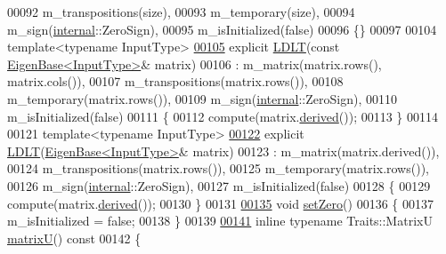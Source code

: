 \begin{DoxyCode}
00092         m\_transpositions(size),
00093         m\_temporary(size),
00094         m\_sign(\hyperlink{namespaceinternal}{internal}::ZeroSign),
00095         m\_isInitialized(false)
00096     \{\}
00097 
00104     \textcolor{keyword}{template}<\textcolor{keyword}{typename} InputType>
\hyperlink{group___cholesky___module_ad0e8d2131ea1a626a08d98e9effb1cc5}{00105}     \textcolor{keyword}{explicit} \hyperlink{group___cholesky___module_ad0e8d2131ea1a626a08d98e9effb1cc5}{LDLT}(\textcolor{keyword}{const} \hyperlink{group___core___module_struct_eigen_1_1_eigen_base}{EigenBase<InputType>}& matrix)
00106       : m\_matrix(matrix.rows(), matrix.cols()),
00107         m\_transpositions(matrix.rows()),
00108         m\_temporary(matrix.rows()),
00109         m\_sign(\hyperlink{namespaceinternal}{internal}::ZeroSign),
00110         m\_isInitialized(false)
00111     \{
00112       compute(matrix.\hyperlink{group___core___module_a324b16961a11d2ecfd2d1b7dd7946545}{derived}());
00113     \}
00114 
00121     \textcolor{keyword}{template}<\textcolor{keyword}{typename} InputType>
\hyperlink{group___cholesky___module_adf853d6cbbc49f3535a44439bca344d9}{00122}     \textcolor{keyword}{explicit} \hyperlink{group___cholesky___module_adf853d6cbbc49f3535a44439bca344d9}{LDLT}(\hyperlink{group___core___module_struct_eigen_1_1_eigen_base}{EigenBase<InputType>}& matrix)
00123       : m\_matrix(matrix.derived()),
00124         m\_transpositions(matrix.rows()),
00125         m\_temporary(matrix.rows()),
00126         m\_sign(\hyperlink{namespaceinternal}{internal}::ZeroSign),
00127         m\_isInitialized(false)
00128     \{
00129       compute(matrix.\hyperlink{group___core___module_a324b16961a11d2ecfd2d1b7dd7946545}{derived}());
00130     \}
00131 
\hyperlink{group___cholesky___module_a776d0ab6c980847297d25b03b5d2216a}{00135}     \textcolor{keywordtype}{void} \hyperlink{group___cholesky___module_a776d0ab6c980847297d25b03b5d2216a}{setZero}()
00136     \{
00137       m\_isInitialized = \textcolor{keyword}{false};
00138     \}
00139 
\hyperlink{group___cholesky___module_a54838a2e31e53bbe4dcb78b5e80c8484}{00141}     \textcolor{keyword}{inline} \textcolor{keyword}{typename} Traits::MatrixU \hyperlink{group___cholesky___module_a54838a2e31e53bbe4dcb78b5e80c8484}{matrixU}()\textcolor{keyword}{ const}
00142 \textcolor{keyword}{    }\{

\end{DoxyCode}
